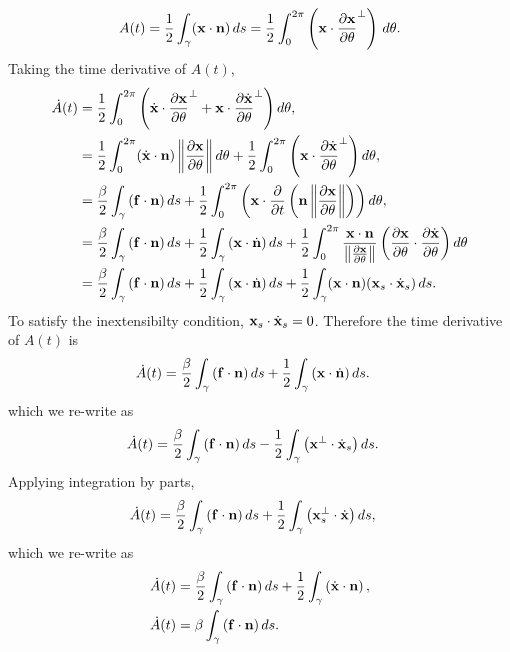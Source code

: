\documentclass[aps,prl,showpacs]{revtex4}
\begin{document}
\begin{align}
  A(t) = \frac{1}{2}\int_{\gamma} (\mathbf{x} \cdot \mathbf{n})\, ds = 
    \frac{1}{2}\int_{0}^{2\pi} \left(\mathbf{x} \cdot \frac{\partial \mathbf{x}}{\partial \theta}^\perp\right)
    \, d\theta.
\end{align}
Taking the time derivative of $A(t)$,
\begin{align}
  \dot{A}(t) &= \frac{1}{2}\int_{0}^{2\pi} \left(\dot{\mathbf{x}} \cdot
  \frac{\partial \mathbf{x}}{\partial \theta}^{\perp} + 
    \mathbf{x} \cdot \frac{\partial \dot{\mathbf{x}}}{\partial \theta}^{\perp}\right) d\theta, \\
  &= \frac{1}{2}
  \int_{0}^{2\pi}(\dot{\mathbf{x}}\cdot\mathbf{n})\left\|\frac{\partial \mathbf{x}}{\partial \theta}\right\|d\theta +
     \frac{1}{2}\int_{0}^{2\pi}
    \left(\mathbf{x} \cdot \frac{\partial \dot{\mathbf{x}}}{\partial \theta}^{\perp}\right)d\theta, \\
  &= \frac{\beta}{2} \int_{\gamma}\left(\mathbf{f}\cdot\mathbf{n}\right)ds +
  \frac{1}{2}\int_{0}^{2\pi}\left(\mathbf{x} \cdot \frac{\partial }{\partial t}\left(\mathbf{n}
  \left\|\frac{\partial \mathbf{x}}{\partial \theta}\right\|\right)\right)d\theta, \\
  &= \frac{\beta}{2} \int_{\gamma}\left(\mathbf{f}\cdot\mathbf{n}\right)ds + \frac{1}{2}
  \int_{\gamma}\left(\mathbf{x}\cdot\dot{\mathbf{n}}\right)ds + \frac{1}{2}\int_{0}^{2\pi}
  \frac{\mathbf{x}\cdot\mathbf{n}}{\left\|\frac{\partial \mathbf{x}}{\partial \theta}\right\|}
  \left(\frac{\partial \mathbf{x}}{\partial \theta}\cdot
  \frac{\partial \dot{\mathbf{x}}}{\partial \theta}\right)d\theta \\
  &= \frac{\beta}{2} \int_{\gamma}\left(\mathbf{f}\cdot\mathbf{n}\right)ds + \frac{1}{2}
  \int_{\gamma}\left(\mathbf{x}\cdot\dot{\mathbf{n}}\right)ds + \frac{1}{2}\int_{\gamma}
  (\mathbf{x}\cdot\mathbf{n}) (\mathbf{x}_s \cdot \dot{\mathbf{x}}_s)\, ds.
\end{align}
To satisfy the inextensibilty condition, $\mathbf{x}_s \cdot \dot{\mathbf{x}}_s = 0$.
Therefore the time derivative of $A(t)$ is
\begin{align}
     \dot{A}(t) &= \frac{\beta}{2} \int_{\gamma}\left(\mathbf{f}\cdot\mathbf{n}\right)ds
     + \frac{1}{2} \int_{\gamma}\left(\mathbf{x}\cdot\dot{\mathbf{n}}\right)ds.
\end{align}
which we re-write as
\begin{align}
    \dot{A}(t) &= \frac{\beta}{2}
    \int_{\gamma}\left(\mathbf{f}\cdot\mathbf{n}\right)ds-\frac{1}{2}\int_{\gamma}\left(\mathbf{x}^{\perp}\cdot\dot{\mathbf{x}}_s\right) ds.
\end{align}
Applying integration by parts,
\begin{align}
    \dot{A}(t) &= \frac{\beta}{2}
    \int_{\gamma}\left(\mathbf{f}\cdot\mathbf{n}\right)ds+\frac{1}{2}\int_{\gamma}\left(\mathbf{x}^{\perp}_s\cdot\dot{\mathbf{x}}\right) ds,
\end{align}
which we re-write as
\begin{align}
    \dot{A}(t) &= \frac{\beta}{2}
    \int_{\gamma}\left(\mathbf{f}\cdot\mathbf{n}\right)ds+\frac{1}{2}\int_{\gamma}\left(\dot{\mathbf{x}}\cdot\mathbf{n}\right),\\
    \dot{A}(t) &= \beta \int_{\gamma}\left(\mathbf{f}\cdot\mathbf{n}\right)ds.
\end{align}
\end{document}
